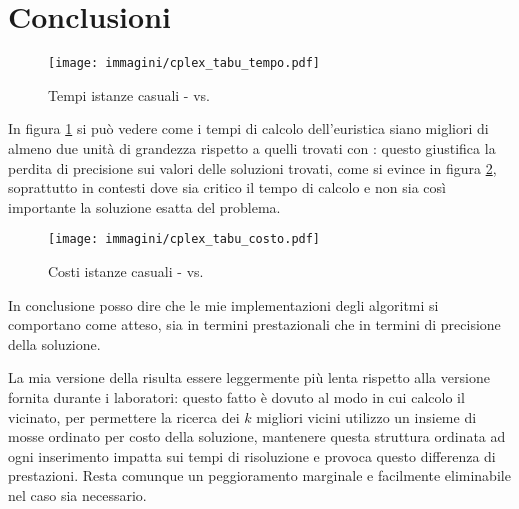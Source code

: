 \section{Conclusioni}

\begin{figure}[htb]
	\centering
	\texttt{[image: immagini/cplex\_tabu\_tempo.pdf]}
	\caption{Tempi istanze casuali -  vs. \tabu}
	\label{fig:tempi cplex tabu}
\end{figure}

In figura \ref{fig:tempi cplex tabu} si può vedere come i tempi di calcolo dell'euristica \tabu siano migliori di almeno due unità di grandezza rispetto a quelli trovati con : questo giustifica la perdita di precisione sui valori delle soluzioni trovati, come si evince in figura \ref{fig:costi cplex tabu}, soprattutto in contesti dove sia critico il tempo di calcolo e non sia così importante la soluzione esatta del problema.

\begin{figure}[htb]
	\centering
	\texttt{[image: immagini/cplex\_tabu\_costo.pdf]}
	\caption{Costi istanze casuali -  vs. \tabu}
	\label{fig:costi cplex tabu}
\end{figure}

In conclusione posso dire che le mie implementazioni degli algoritmi si comportano come atteso, sia in termini prestazionali che in termini di precisione della soluzione.

La mia versione della \tabu risulta essere leggermente più lenta rispetto alla versione fornita durante i laboratori: questo fatto è dovuto al modo in cui calcolo il vicinato, per permettere la ricerca dei $k$ migliori vicini utilizzo un insieme di mosse ordinato per costo della soluzione, mantenere questa struttura ordinata ad ogni inserimento impatta sui tempi di risoluzione e provoca questo differenza di prestazioni.
Resta comunque un peggioramento marginale e facilmente eliminabile nel caso sia necessario.
